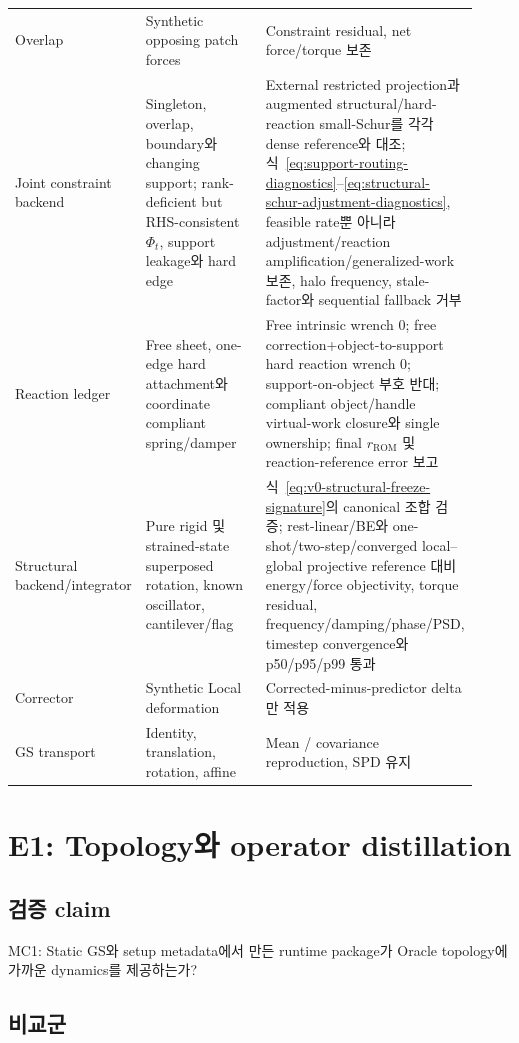 \documentclass[11pt,a4paper]{article}
\begin{document}
\begin{longtable}{L{0.26\linewidth}L{0.34\linewidth}L{0.32\linewidth}}
\addlinespace
Overlap & Synthetic opposing patch forces & Constraint residual, net force/torque 보존 \\
\addlinespace
Joint constraint backend & Singleton, overlap, boundary와 changing support; rank-deficient but RHS-consistent \(\Phi_t\), support leakage와 hard edge &
External restricted projection과 augmented structural/hard-reaction small-Schur를 각각 dense reference와 대조; 식~\eqref{eq:support-routing-diagnostics}--\eqref{eq:structural-schur-adjustment-diagnostics}, feasible rate뿐 아니라 adjustment/reaction amplification/generalized-work 보존, halo frequency, stale-factor와 sequential fallback 거부 \\
\addlinespace
Reaction ledger & Free sheet, one-edge hard attachment와 coordinate compliant spring/damper & Free intrinsic wrench 0; free correction+object-to-support hard reaction wrench 0; support-on-object 부호 반대; compliant object/handle virtual-work closure와 single ownership; final \(r_{\mathrm{ROM}}\) 및 reaction-reference error 보고 \\
\addlinespace
Structural backend/integrator & Pure rigid 및 strained-state superposed rotation, known oscillator, cantilever/flag & 식~\eqref{eq:v0-structural-freeze-signature}의 canonical 조합 검증; rest-linear/BE와 one-shot/two-step/converged local--global projective reference 대비 energy/force objectivity, torque residual, frequency/damping/phase/PSD, timestep convergence와 p50/p95/p99 통과 \\
\addlinespace
Corrector & Synthetic Local deformation & Corrected-minus-predictor delta만 적용 \\
\addlinespace
GS transport & Identity, translation, rotation, affine & Mean / covariance reproduction, SPD 유지 \\
\bottomrule
\end{longtable}

\section{E1: Topology와 operator distillation}

\subsection*{검증 claim}

MC1: Static GS와 setup metadata에서 만든 runtime package가 Oracle topology에 가까운 dynamics를 제공하는가?

\subsection*{비교군}
\end{document}
